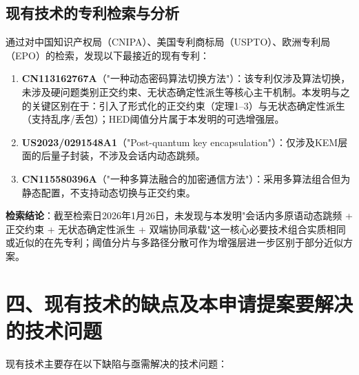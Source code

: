 ﻿\documentclass[12pt,a4paper]{article}
\begin{document}
\subsection*{现有技术的专利检索与分析}

通过对中国知识产权局（CNIPA）、美国专利商标局（USPTO）、欧洲专利局（EPO）的检索，发现以下最接近的现有专利：

\begin{enumerate}[label=(\arabic*)]
    \item \textbf{CN113162767A}（"一种动态密码算法切换方法"）：该专利仅涉及算法切换，未涉及硬问题类别正交约束、无状态确定性派生等核心主干机制。本发明与之的关键区别在于：引入了形式化的正交约束（定理1--3）与无状态确定性派生（支持乱序/丢包）；HED阈值分片属于本发明的可选增强层。
    \item \textbf{US2023/0291548A1}（"Post-quantum key encapsulation"）：仅涉及KEM层面的后量子封装，不涉及会话内动态跳频。
    \item \textbf{CN115580396A}（"一种多算法融合的加密通信方法"）：采用多算法组合但为静态配置，不支持动态切换与正交约束。
\end{enumerate}

\textbf{检索结论}：截至检索日2026年1月26日，未发现与本发明"会话内多原语动态跳频 + 正交约束 + 无状态确定性派生 + 双端协同承载"这一核心必要技术组合实质相同或近似的在先专利；阈值分片与多路径分散可作为增强层进一步区别于部分近似方案。

\section*{四、现有技术的缺点及本申请提案要解决的技术问题}

现有技术主要存在以下缺陷与亟需解决的技术问题：
\end{document}
